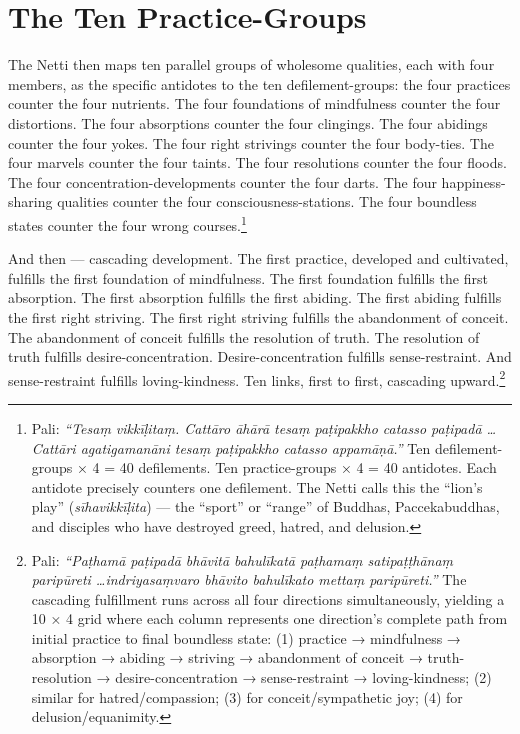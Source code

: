\section*{The Ten Practice-Groups}

The Netti then maps ten parallel groups of wholesome qualities, each with four members, as the specific antidotes to the ten defilement-groups: the four practices counter the four nutrients. The four foundations of mindfulness counter the four distortions. The four absorptions counter the four clingings. The four abidings counter the four yokes. The four right strivings counter the four body-ties. The four marvels counter the four taints. The four resolutions counter the four floods. The four concentration-developments counter the four darts. The four happiness-sharing qualities counter the four consciousness-stations. The four boundless states counter the four wrong courses.\footnote{Pali: \textit{``Tesaṃ vikkīḷitaṃ. Cattāro āhārā tesaṃ paṭipakkho catasso paṭipadā \ldots Cattāri agatigamanāni tesaṃ paṭipakkho catasso appamāṇā.''} Ten defilement-groups × 4 = 40 defilements. Ten practice-groups × 4 = 40 antidotes. Each antidote precisely counters one defilement. The Netti calls this the ``lion's play'' (\textit{sīhavikkīḷita}) --- the ``sport'' or ``range'' of Buddhas, Paccekabuddhas, and disciples who have destroyed greed, hatred, and delusion.}

And then --- cascading development. The first practice, developed and cultivated, fulfills the first foundation of mindfulness. The first foundation fulfills the first absorption. The first absorption fulfills the first abiding. The first abiding fulfills the first right striving. The first right striving fulfills the abandonment of conceit. The abandonment of conceit fulfills the resolution of truth. The resolution of truth fulfills desire-concentration. Desire-concentration fulfills sense-restraint. And sense-restraint fulfills loving-kindness. Ten links, first to first, cascading upward.\footnote{Pali: \textit{``Paṭhamā paṭipadā bhāvitā bahulīkatā paṭhamaṃ satipaṭṭhānaṃ paripūreti \ldots indriyasaṃvaro bhāvito bahulīkato mettaṃ paripūreti.''} The cascading fulfillment runs across all four directions simultaneously, yielding a 10 × 4 grid where each column represents one direction's complete path from initial practice to final boundless state: (1) practice → mindfulness → absorption → abiding → striving → abandonment of conceit → truth-resolution → desire-concentration → sense-restraint → loving-kindness; (2) similar for hatred/compassion; (3) for conceit/sympathetic joy; (4) for delusion/equanimity.}


